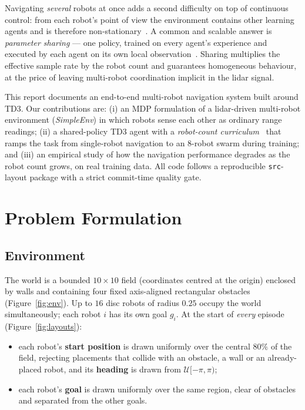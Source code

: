 \documentclass[11pt,a4paper]{article}
\newcommand{\CurriculumCap}{8}
\begin{document}
Navigating \emph{several} robots at once adds a second difficulty on top of
continuous control: from each robot's point of view the environment contains
other learning agents and is therefore non-stationary~\cite{tan1993}. A
common and scalable answer is \emph{parameter sharing} — one policy, trained
on every agent's experience and executed by each agent on its own local
observation~\cite{gupta2017,long2018}. Sharing multiplies the effective
sample rate by the robot count and guarantees homogeneous behaviour, at the
price of leaving multi-robot coordination implicit in the lidar signal.

This report documents an end-to-end multi-robot navigation system built
around TD3. Our contributions are: (i) an MDP formulation of a lidar-driven
multi-robot environment (\emph{SimpleEnv}) in which robots sense each other
as ordinary range readings; (ii) a shared-policy TD3 agent with a
\emph{robot-count curriculum}~\cite{bengio2009} that ramps the task from
single-robot navigation to an \CurriculumCap-robot swarm during training;
and (iii) an empirical study of how the navigation performance degrades as
the robot count grows, on real training data. All code follows a
reproducible \texttt{src}-layout package with a strict commit-time quality
gate.

\section{Problem Formulation}
\subsection{Environment}
The world is a bounded $10 \times 10$ field (coordinates centred at the
origin) enclosed by walls and containing four fixed axis-aligned rectangular
obstacles (Figure~\ref{fig:env}). Up to $16$ disc robots of radius $0.25$
occupy the world simultaneously; each robot $i$ has its own goal
$g_i$. At the start of \emph{every} episode (Figure~\ref{fig:layouts}):

\begin{itemize}
  \item each robot's \textbf{start position} is drawn uniformly over the
        central $80\%$ of the field, rejecting placements that collide with
        an obstacle, a wall or an already-placed robot, and its
        \textbf{heading} is drawn from $\mathcal{U}[-\pi, \pi)$;
  \item each robot's \textbf{goal} is drawn uniformly over the same region,
        clear of obstacles and separated from the other goals.
\end{itemize}
\end{document}
